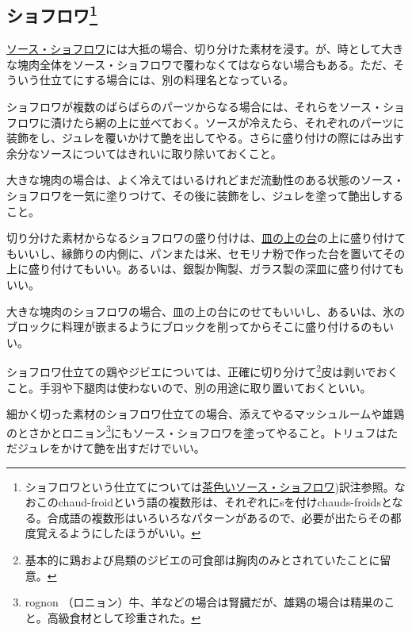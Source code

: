 \begin{Main}
\hypertarget{chauds-froids}{%
\subsection[ショフロワ]{\texorpdfstring{ショフロワ\footnote{ショフロワという仕立てについては\protect\hyperlink{sauce-chaud-froid-brune}{茶色いソース・ショフロワ})訳注参照。なおこのchaud-froidという語の複数形は、それぞれにsを付けchauds-froidsとなる。合成語の複数形はいろいろなパターンがあるので、必要が出たらその都度覚えるようにしたほうがいい。}}{ショフロワ}}\label{chauds-froids}}



\protect\hyperlink{sauce-chaud-froid-ordinaire}{ソース・ショフロワ}には大抵の場合、切り分けた素材を浸す。が、時として大きな塊肉全体をソース・ショフロワで覆わなくてはならない場合もある。ただ、そういう仕立てにする場合には、別の料理名となっている。

ショフロワが複数のばらばらのパーツからなる場合には、それらをソース・ショフロワに漬けたら網の上に並べておく。ソースが冷えたら、それぞれのパーツに装飾をし、ジュレを覆いかけて艶を出してやる。さらに盛り付けの際にはみ出す余分なソースについてはきれいに取り除いておくこと。

大きな塊肉の場合は、よく冷えてはいるけれどまだ流動性のある状態のソース・ショフロワを一気に塗りつけて、その後に装飾をし、ジュレを塗って艶出しすること。

切り分けた素材からなるショフロワの盛り付けは、\protect\hyperlink{fonds-de-plats}{皿の上の台}の上に盛り付けてもいいし、縁飾りの内側に、パンまたは米、セモリナ粉で作った台を置いてその上に盛り付けてもいい。あるいは、銀製か陶製、ガラス製の深皿に盛り付けてもいい。

大きな塊肉のショフロワの場合、皿の上の台にのせてもいいし、あるいは、氷のブロックに料理が嵌まるようにブロックを削ってからそこに盛り付けるのもいい。

ショフロワ仕立ての鶏やジビエについては、正確に切り分けて\footnote{基本的に鶏および鳥類のジビエの可食部は胸肉のみとされていたことに留意。}皮は剥いでおくこと。手羽や下腿肉は使わないので、別の用途に取り置いておくといい。

細かく切った素材のショフロワ仕立ての場合、添えてやるマッシュルームや雄鶏のとさかとロニョン\footnote{rognon
  （ロニョン）牛、羊などの場合は腎臓だが、雄鶏の場合は精巣のこと。高級食材として珍重された。}にもソース・ショフロワを塗ってやること。トリュフはただジュレをかけて艶を出すだけでいい。


\end{Main}

